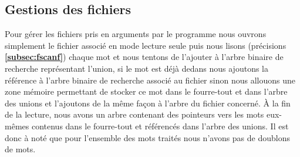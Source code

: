 \documentclass{article}
\begin{document}
\subsection{Gestions des fichiers}\label{subsec:files}
Pour gérer les fichiers pris en arguments par le programme nous ouvrons simplement le fichier
associé en mode lecture seule puis nous lisons (précisions \textbf{\ref{subsec:fscanf}}) chaque
mot et nous tentons de l'ajouter à l'arbre binaire de recherche représentant l'union, si le mot est
déjà dedans nous ajoutons la référence à l'arbre binaire de recherche associé au fichier sinon nous allouons
une zone mémoire permettant de stocker ce mot dans le fourre-tout et dans l'arbre des unions et l'ajoutons de la même façon à l'arbre du 
fichier concerné. À la fin de la lecture, nous avons un arbre contenant des pointeurs vers les mots eux-mêmes contenus 
dans le fourre-tout et référencés dans l'arbre des unions. Il est donc à noté que pour l'ensemble des mots traités nous n'avons pas de doublons de mots.
\end{document}
